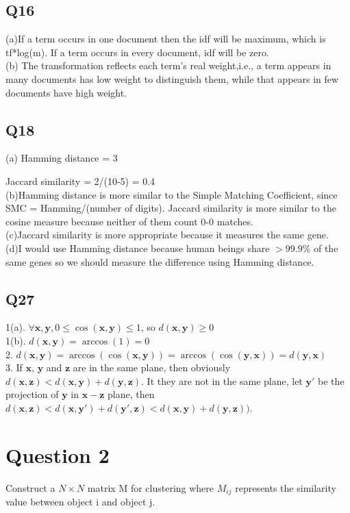 \documentclass[a4paper]{article}
\begin{document}
\subsection{Q16}
(a)If a term occurs in one document then the idf will be maximum, which is tf*log(m). If a term occurs in every document, idf will be zero.
\\(b) The transformation reflects each term's real weight,i.e., a term appears in many documents has low weight to distinguish them, while that appears in few documents have high weight.
\subsection{Q18}
(a) Hamming distance = 3
\par Jaccard similarity = 2/(10-5) = 0.4
\\(b)Hamming distance is more similar to the Simple Matching Coefficient, since SMC = Hamming/(number of digits). Jaccard similarity is more similar to the cosine measure because neither of them count 0-0 matches.
\\(c)Jaccard similarity is more appropriate because it measures the same gene.
\\(d)I would use Hamming distance because human beings share $> 99.9\%$ of the same genes so we should measure the difference using Hamming distance.
\subsection{Q27}
1(a). $\forall \mathbf{x},\mathbf{y},0\leq \cos(\mathbf{x},\mathbf{y})\leq 1$, so $d(\mathbf{x},\mathbf{y})\geq 0 $ 
\\1(b). $d(\mathbf{x},\mathbf{y}) = \arccos(1) = 0$
\\2. $d(\mathbf{x},\mathbf{y}) = \arccos(\cos(\mathbf{x},\mathbf{y})) = \arccos(\cos(\mathbf{y},\mathbf{x})) = d(\mathbf{y},\mathbf{x})$
\\3. If $\mathbf{x}$, $\mathbf{y}$ and $\mathbf{z}$ are in the same plane, then obviously $d(\mathbf{x},\mathbf{z}) < d(\mathbf{x},\mathbf{y})+d(\mathbf{y},\mathbf{z})$. It they are not in the same plane, let $\mathbf{y'}$ be the projection of $\mathbf{y}$ in $\mathbf{x}-\mathbf{z}$ plane, then $d(\mathbf{x},\mathbf{z}) < d(\mathbf{x},\mathbf{y'})+d(\mathbf{y'},\mathbf{z}) < d(\mathbf{x},\mathbf{y})+d(\mathbf{y},\mathbf{z}))$.
\section{Question 2}
Construct a $N \times N$ matrix M for clustering where $M_{ij}$ represents the similarity value between object i and object j.
\end{document}
